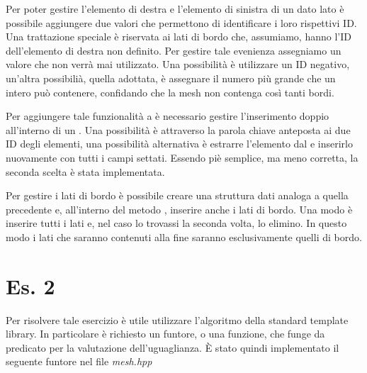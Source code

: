 \lstset{basicstyle=\scriptsize\sf}

\lstset{basicstyle=\sf}

Per poter gestire l'elemento di destra
e l'elemento di sinistra di un dato lato \`e possibile aggiungere due valori che permettono
di identificare i loro rispettivi ID. Una trattazione speciale \`e riservata ai lati
di bordo che, assumiamo, hanno l'ID dell'elemento di destra non definito. Per 
gestire tale evenienza assegniamo un valore che non verr\`a mai utilizzato. Una 
possibilit\`a \`e utilizzare un ID negativo, un'altra possibili\`a, quella adottata,
\`e assegnare il numero pi\`u grande che un intero pu\`o contenere, confidando che la
mesh non contenga cos\`i tanti bordi. 

\lstset{basicstyle=\scriptsize\sf}

\lstset{basicstyle=\sf}

Per aggiungere tale funzionalit\`a a 
\`e necessario gestire l'inserimento doppio all'interno di un . Una possibilit\`a
\`e attraverso la parola chiave  anteposta ai due ID degli elementi, una
possibilit\`a alternativa \`e estrarre l'elemento dal  e inserirlo nuovamente
con tutti i campi settati. Essendo pi\`e semplice, ma meno corretta, la seconda scelta
\`e stata implementata.

\lstset{basicstyle=\scriptsize\sf}

\lstset{basicstyle=\sf}

Per gestire i lati di bordo \`e possibile creare una struttura dati analoga a quella precedente
e, all'interno del metodo , inserire anche i lati di bordo. Una modo \`e
inserire tutti i lati e, nel caso lo trovassi la seconda volta, lo elimino. In questo modo
i lati che saranno contenuti alla fine saranno esclusivamente quelli di bordo.

\lstset{basicstyle=\scriptsize\sf}

\lstset{basicstyle=\sf}

\section*{Es. 2}
Per risolvere tale esercizio \`e utile utilizzare l'algoritmo 
della standard template library. In particolare \`e richiesto un funtore, o una funzione, 
che funge da predicato per la valutazione dell'uguaglianza. \`E stato quindi implementato
il seguente funtore nel file \textit{mesh.hpp}

